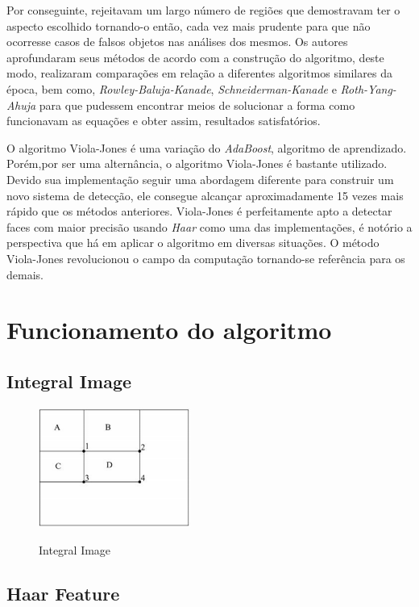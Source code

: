 \documentclass[12pt,a4paper]{article}
\begin{document}
	Por conseguinte, rejeitavam um largo número de regiões que demostravam ter o aspecto escolhido tornando-o então, cada vez mais prudente para que não ocorresse casos de falsos objetos nas análises dos mesmos. Os autores aprofundaram seus métodos de acordo com a construção do algoritmo, deste modo, realizaram comparações em relação a diferentes algoritmos similares da época, bem como, \textit{Rowley-Baluja-Kanade}, \textit{Schneiderman-Kanade} e\textit{ Roth-Yang-Ahuja} para que pudessem encontrar meios de solucionar a forma como funcionavam as equações e obter assim, resultados satisfatórios. 

	O algoritmo Viola-Jones é uma variação do \textit{AdaBoost}, algoritmo de aprendizado. Porém,por ser uma alternância, o algoritmo Viola-Jones é bastante utilizado. Devido sua implementação seguir uma abordagem diferente para construir um novo sistema de detecção, ele consegue alcançar aproximadamente 15 vezes mais rápido que os métodos anteriores. Viola-Jones é perfeitamente apto a detectar faces com maior precisão usando \textit{Haar} como uma das implementações, é notório a perspectiva que há em aplicar o algoritmo em diversas situações. O método Viola-Jones revolucionou o campo da computação tornando-se referência para os demais. 

\section{Funcionamento do algoritmo} 

\subsection{Integral Image}


\begin{figure}[h!]
\centering
\includegraphics[width=5cm]{recursos/imagens/Integral.png}
\label{1}
\caption{Integral Image}
\end{figure} 

\subsection{Haar Feature}
\end{document}
